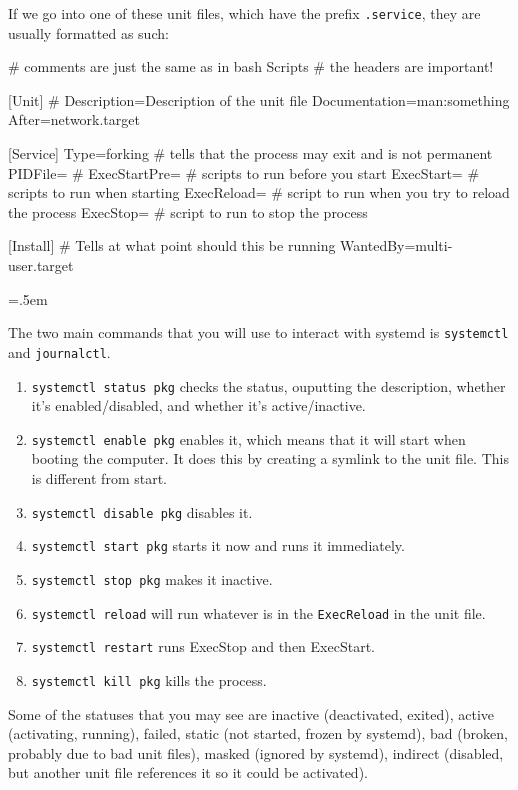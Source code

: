 \documentclass{article}
\newenvironment{cverbatim}
 {\SaveVerbatim{cverb}}
 {\endSaveVerbatim
  \flushleft\fboxrule=0pt\fboxsep=.5em
  \colorbox{cverbbg}{%
    \makebox[\dimexpr\linewidth-2\fboxsep][l]{\BUseVerbatim{cverb}}%
  }
  \endflushleft
}
\begin{document}
    If we go into one of these unit files, which have the prefix \texttt{.service}, they are usually formatted as such: 

    \begin{cverbatim}
      # comments are just the same as in bash Scripts
      # the headers are important! 

      [Unit]        #  
      Description=Description of the unit file 
      Documentation=man:something 
      After=network.target

      [Service]
      Type=forking  # tells that the process may exit and is not permanent
      PIDFile=      # 
      ExecStartPre= # scripts to run before you start 
      ExecStart=    # scripts to run when starting 
      ExecReload=   # script to run when you try to reload the process
      ExecStop=     # script to run to stop the process 

      [Install]   # Tells at what point should this be running
      WantedBy=multi-user.target 

    \end{cverbatim}

    The two main commands that you will use to interact with systemd is \texttt{systemctl} and \texttt{journalctl}. 
    
    \begin{enumerate}
      \item \texttt{systemctl status pkg} checks the status, ouputting the description, whether it's enabled/disabled, and whether it's active/inactive. 
      \item \texttt{systemctl enable pkg} enables it, which means that it will start when booting the computer. It does this by creating a symlink to the unit file. This is different from start. 
      \item \texttt{systemctl disable pkg} disables it. 
      \item \texttt{systemctl start pkg} starts it now and runs it immediately. 
      \item \texttt{systemctl stop pkg} makes it inactive. 
      \item \texttt{systemctl reload} will run whatever is in the \texttt{ExecReload} in the unit file. 
      \item \texttt{systemctl restart} runs ExecStop and then ExecStart. 
      \item \texttt{systemctl kill pkg} kills the process. 
    \end{enumerate}

    Some of the statuses that you may see are inactive (deactivated, exited), active (activating, running), failed, static (not started, frozen by systemd), bad (broken, probably due to bad unit files), masked (ignored by systemd), indirect (disabled, but another unit file references it so it could be activated). 
\end{document}
